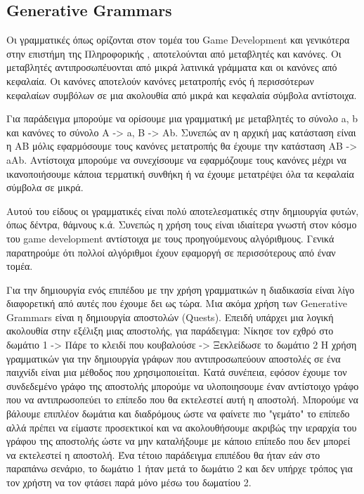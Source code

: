\subsection{Generative Grammars}
Οι γραμματικές όπως ορίζονται στον τομέα του Game Development και γενικότερα στην επιστήμη της Πληροφορικής \cite{grammars}, αποτελούνται από μεταβλητές και κανόνες. Οι μεταβλητές αντιπροσωπέυονται από μικρά λατινικά γράμματα και οι κανόνες από κεφαλαία. Οι κανόνες αποτελούν κανόνες μετατροπής ενός ή περισσότερων κεφαλαίων συμβόλων σε μια ακολουθία από μικρά και κεφαλαία σύμβολα αντίστοιχα.
\par 
Για παράδειγμα μπορούμε να ορίσουμε μια γραμματική με μεταβλητές το σύνολο {a, b} και κανόνες το σύνολο {Α -> a, B -> Ab}. Συνεπώς αν η αρχική μας κατάσταση είναι η {ΑΒ} μόλις εφαρμόσουμε τους κανόνες μετατροπής θα έχουμε την κατάσταση {ΑΒ} -> {aΑb}. Αντίστοιχα μπορούμε να συνεχίσουμε να εφαρμόζουμε τους κανόνες μέχρι να ικανοποιήσουμε κάποια τερματική συνθήκη ή να έχουμε μετατρέψει όλα τα κεφαλαία σύμβολα σε μικρά.
\par
Αυτού του είδους οι γραμματικές είναι πολύ αποτελεσματικές στην δημιουργία φυτών, όπως δέντρα, θάμνους κ.ά. Συνεπώς η χρήση τους είναι ιδιαίτερα γνωστή στον κόσμο του game development αντίστοιχα με τους προηγούμενους αλγόριθμους. Γενικά παρατηρούμε ότι πολλοί αλγόριθμοι έχουν εφαμοργή σε περισσότερους από έναν τομέα.
\par
Για την δημιουργία ενός επιπέδου με την χρήση γραμματικών η διαδικασία είναι λίγο διαφορετική από αυτές που έχουμε δει ως τώρα. Μια ακόμα χρήση των Generative Grammars είναι η δημιουργία αποστολών (Quests). Επειδή υπάρχει μια λογική ακολουθία στην εξέλιξη μιας αποστολής, για παράδειγμα:
\newline
Νίκησε τον εχθρό στο δωμάτιο 1 -> Πάρε το κλειδί που κουβαλούσε -> Ξεκλείδωσε το δωμάτιο 2 
\newline
Η χρήση γραμματικών για την δημιουργία γράφων που αντιπροσωπεύουν αποστολές σε ένα παιχνίδι είναι μια μέθοδος που χρησιμοποιείται. Κατά συνέπεια, εφόσον έχουμε τον συνδεδεμένο γράφο της αποστολής μπορούμε να υλοποιησουμε έναν αντίστοιχο γράφο που να αντιπρωσοπεύει το επίπεδο που θα εκτελεστεί αυτή η αποστολή. Μπορούμε να βάλουμε επιπλέον δωμάτια και διαδρόμους ώστε να φαίνετε πιο "γεμάτο" το επίπεδο αλλά πρέπει να είμαστε προσεκτικοί και να ακολουθήσουμε ακριβώς την ιεραρχία του γράφου της αποστολής ώστε να μην καταλήξουμε με κάποιο επίπεδο που δεν μπορεί να εκτελεστεί η αποστολή. Ένα τέτοιο παράδειγμα επιπέδου θα ήταν εάν στο παραπάνω σενάριο, το δωμάτιο 1 ήταν μετά το δωμάτιο 2 και δεν υπήρχε τρόπος για τον χρήστη να τον φτάσει παρά μόνο μέσω του δωματίου 2.
